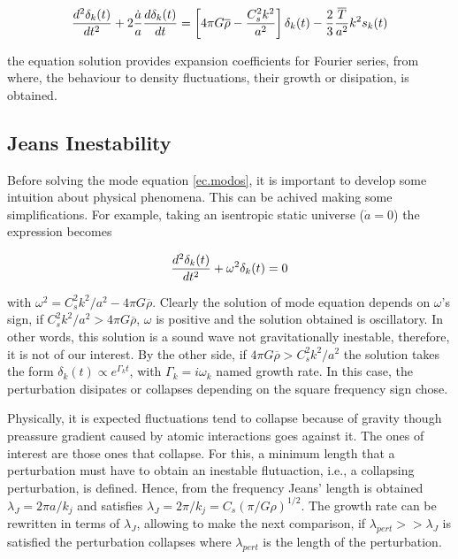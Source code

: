 \begin{equation}
\frac{d^2\delta_k(t)}{dt^2}+2\frac{\dot{a}}{a}\frac{d \delta_k(t)}{d t} = 
\left[4\pi G\overline{\rho}-\frac{C_s^2 k^2}{a^2}\right]\delta_k(t)
-\frac{2}{3}\frac{\overline{T}}{a^2}k^2s_k(t)
\label{ec.modos}
\end{equation}

the equation solution provides expansion coefficients for Fourier series,
from where, the behaviour to density fluctuations, their growth or 
disipation, is obtained. 

\subsection{ Jeans Inestability}

Before solving the mode equation \ref{ec.modos}, it is important to develop
some intuition about physical phenomena. This can be achived making some 
simplifications. For example, taking an isentropic static universe ($\dot{a}=0$)
the expression becomes

\[
\frac{d^2\delta_k(t)}{dt^2} +
\omega^2\delta_k(t) = 0
\]

with $\omega^2 = C_s^2k^2/a^2-4\pi G\overline{\rho}$. Clearly the solution of mode 
equation depends on $\omega$'s sign, if $C_s^2k^2/a^2>4\pi G\overline{\rho}$,  
$\omega$ is positive and the solution obtained is oscillatory. In other words, 
this solution is a sound wave not gravitationally inestable, therefore, it is
not of our interest. 
By the other side, if $4\pi G\overline{\rho}>C_s^2k^2/a^2$ the solution takes
the form $\delta_k(t)\propto e^{\Gamma_k t}$, with $\Gamma_k=i\omega_k$ named
growth rate. In this case, the perturbation disipates or collapses depending
on the square frequency sign chose. 

Physically, it is expected fluctuations tend to collapse 
because of gravity though preassure gradient caused by atomic
interactions goes against it. The ones of interest are those
ones that collapse. For this, a minimum length that a perturbation
must have to obtain an inestable flutuaction, i.e., a collapsing
perturbation, is defined. Hence, from the frequency Jeans' length
is obtained $\lambda_J = 2\pi a/k_j$ and satisfies 
$\lambda_J = 2\pi/k_j = C_s(\pi/G\rho)^{1/2}$.
The growth rate can be rewritten in terms of $\lambda_J$, 
allowing to make the next comparison, if $\lambda_{pert}>>\lambda_J$
is satisfied the perturbation collapses where $\lambda_{pert}$
is the length of the perturbation.


